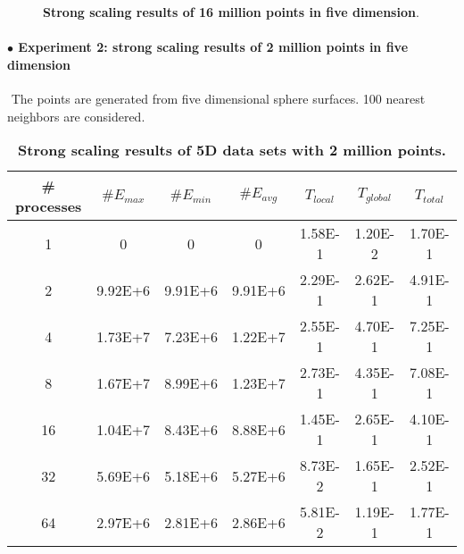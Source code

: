 \documentclass[12pt]{article}
\begin{document}
\begin{appendices}
\begin{figure}[h]
	\caption{\textbf{Strong scaling results of 16 million points in five dimension}.}
	\label{16M5D_nopar}
\end{figure}
\clearpage

\paragraph{$\bullet$ Experiment 2: strong scaling results of 2 million points in five dimension}
$ $\newline
\indent The points are generated from five dimensional sphere surfaces. 100 nearest neighbors are considered.
$ $\newline
\renewcommand{\arraystretch}{1.7}
\begin{table}[h]
\centering
    \caption{\textbf{Strong scaling results of 5D data sets with 2 million points.} }
	\label{2M5D}
\begin{tabular}{ccccccc}
    \hline %
\# processes  &$\# E_{max}$   &$\# E_{min}$ &$\# E_{avg}$  &$T_{local}$  &$T_{global}$  &$T_{total}$\\
\hline\hline
1   &0   &0     &0   &1.58E-1    &1.20E-2    &1.70E-1 \\
2   &9.92E+6    &9.91E+6    &9.91E+6    &2.29E-1    &2.62E-1    &4.91E-1\\
4   &1.73E+7    &7.23E+6    &1.22E+7    &2.55E-1    &4.70E-1    &7.25E-1\\
8   &1.67E+7    &8.99E+6    &1.23E+7    &2.73E-1    &4.35E-1    &7.08E-1\\
16  &1.04E+7    &8.43E+6    &8.88E+6    &1.45E-1    &2.65E-1    &4.10E-1\\
32  &5.69E+6    &5.18E+6    &5.27E+6    &8.73E-2    &1.65E-1    &2.52E-1\\
64  &2.97E+6    &2.81E+6    &2.86E+6    &5.81E-2    &1.19E-1    &1.77E-1\\
\hline
    \end{tabular}
\end{table}


\end{appendices}
\end{document}

